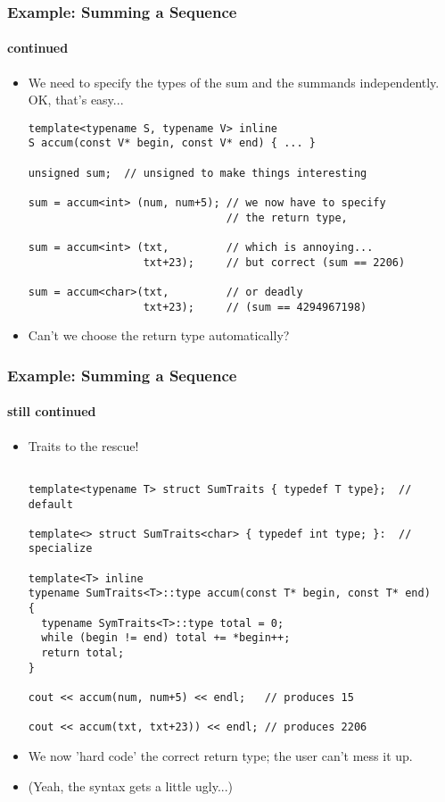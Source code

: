 \begin{frame}[fragile,t]
\frametitle{Example: Summing a Sequence}
\framesubtitle{continued}
\begin{itemize}[<+->]
\item We need to specify the types of the sum and the summands
  independently.  OK, that's easy...
{\scriptsize\begin{verbatim}
template<typename S, typename V> inline
S accum(const V* begin, const V* end) { ... }

unsigned sum;  // unsigned to make things interesting

sum = accum<int> (num, num+5); // we now have to specify
                               // the return type,

sum = accum<int> (txt,         // which is annoying...
                  txt+23);     // but correct (sum == 2206)

sum = accum<char>(txt,         // or deadly
                  txt+23);     // (sum == 4294967198)
\end{verbatim}
}
\vskip 12pt
\item Can't we choose the return type automatically?
\end{itemize}
\end{frame}



\begin{frame}[fragile,t]
\frametitle{Example: Summing a Sequence}
\framesubtitle{still continued}
\begin{itemize}[<+->]
\item Traits to the rescue!
{\scriptsize\begin{verbatim}

template<typename T> struct SumTraits { typedef T type};  // default

template<> struct SumTraits<char> { typedef int type; }:  // specialize

template<T> inline
typename SumTraits<T>::type accum(const T* begin, const T* end) 
{
  typename SymTraits<T>::type total = 0;
  while (begin != end) total += *begin++;
  return total;
}

cout << accum(num, num+5) << endl;   // produces 15

cout << accum(txt, txt+23)) << endl; // produces 2206
\end{verbatim}
}

\vskip 12pt
\item We now 'hard code' the correct return type; the user can't mess
  it up.
\vskip 12pt
\item (Yeah, the syntax gets a little ugly...)
\end{itemize}
\end{frame}

